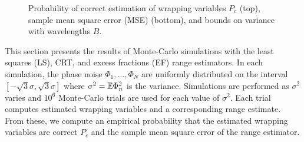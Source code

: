 \begin{figure}
\caption{Probability of correct estimation of wrapping variables $P_c$ (top), sample mean square error (MSE) (bottom), and bounds on variance with wavelengths $B$.}\label{fig:eastsquares_CRT-2}  
\end{figure}

This section presents the results of Monte-Carlo simulations with the least squares (LS), CRT, and excess fractions (EF) range estimators. In each simulation, the phase noise $\Phi_1,\dots,\Phi_N$ are uniformly distributed on the interval $[-\sqrt{3} \sigma, \sqrt{3} \sigma]$ where $\sigma^2 = {\mathbb E} \Phi_n^2$ is the variance. %
Simulations are performed as $\sigma^2$ varies and $10^6$ Monte-Carlo trials are used for each value of $\sigma^2$.  Each trial computes estimated wrapping variables and a corresponding range estimate.  From these, we compute an empirical probability that the estimated wrapping variables are correct $P_c$ and the sample mean square error of the range estimator.  



